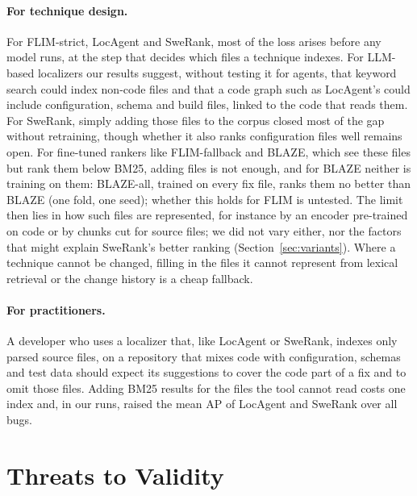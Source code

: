 \documentclass[a4paper,fleqn]{cas-dc}
\begin{document}
\paragraph{For technique design.} For FLIM-strict, LocAgent and SweRank, most
of the loss arises before any model runs, at the step that decides which files
a technique indexes. For
LLM-based localizers our results suggest, without testing it for agents, that
keyword search could index non-code files and that a code graph such as
LocAgent's could include configuration, schema and build files, linked to the
code that reads them. For SweRank, simply adding those
files to the corpus closed most of the gap without retraining, though whether
it also ranks configuration files well remains open. For fine-tuned rankers
like FLIM-fallback and BLAZE, which see these files but rank them below BM25,
adding files is not enough, and for BLAZE neither is training on them:
BLAZE-all, trained on every fix file, ranks them no better than BLAZE (one
fold, one seed); whether this holds for FLIM is untested. The limit then lies in how
such files are represented, for instance by an encoder pre-trained on code or
by chunks cut for source files; we did not vary either, nor the factors that
might explain SweRank's better ranking (Section~\ref{sec:variants}). Where a
technique cannot be changed, filling in the files it cannot represent from
lexical retrieval or the change history is a cheap fallback.

\paragraph{For practitioners.} A developer who uses a localizer that, like
LocAgent or SweRank, indexes only parsed source files, on a repository that mixes code with configuration, schemas and
test data should expect its suggestions to cover the code part of a fix and
to omit those files. Adding BM25 results for the files the tool cannot read
costs one index and, in our runs, raised the mean AP of LocAgent and SweRank
over all bugs.

\section{Threats to Validity}\label{sec:threats}
\end{document}
